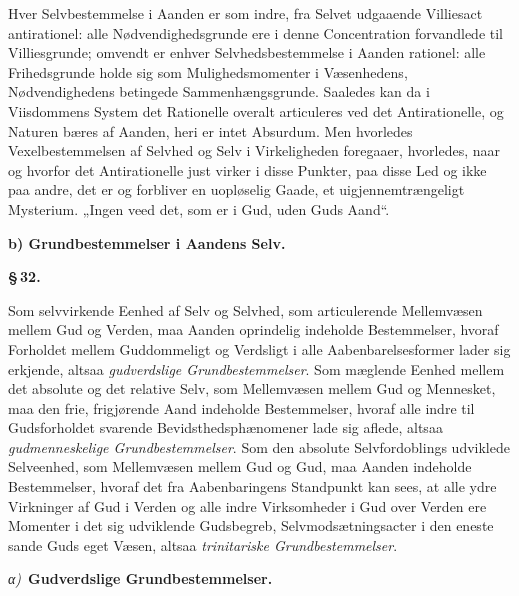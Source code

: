 \documentclass[12pt]{book}
\newcommand{\parmark}[1]{\begin{center}{\bfseries \S\,#1.}\end{center}}
\newcommand{\runhead}[1]{%
  \medskip\begin{center}{\bfseries #1}\end{center}\medskip}
\newcommand{\greekrun}[2]{%
  \medskip\begin{center}{\itshape #1)}\ {\bfseries #2}\end{center}\medskip}
\begin{document}
Hver Selvbestemmelse i Aanden er som indre, fra Selvet udgaaende
Villiesact antirationel: alle Nødvendighedsgrunde ere i denne
Concentration forvandlede til Villiesgrunde; omvendt er enhver
Selvhedsbestemmelse i Aanden rationel: alle Frihedsgrunde holde sig
som Mulighedsmomenter i Væsenhedens, Nødvendighedens betingede
Sammenhængsgrunde. Saaledes kan da i Viisdommens System det
Rationelle overalt articuleres ved det Antirationelle, og Naturen
bæres af Aanden, heri er intet Absurdum. Men hvorledes
Vexelbestemmelsen af Selvhed og Selv i Virkeligheden foregaaer,
hvorledes, naar og hvorfor det Antirationelle just virker i disse
Punkter, paa disse Led og ikke paa andre, det er og forbliver en
uopløselig Gaade, et uigjennemtrængeligt Mysterium. „Ingen veed det,
som er i Gud, uden Guds Aand“.

\runhead{b) Grundbestemmelser i Aandens Selv.}
\parmark{32}

Som selvvirkende Eenhed af Selv og Selvhed, som articulerende
Mellemvæsen mellem Gud og Verden, maa Aanden oprindelig indeholde
Bestemmelser, hvoraf Forholdet mellem Guddommeligt og Verdsligt i
alle Aabenbarelsesformer lader sig erkjende, altsaa
\emph{gudverdslige
Grundbestemmelser}. Som mæglende Eenhed mellem det absolute og det
relative Selv, som Mellemvæsen mellem Gud og Mennesket, maa den
frie, frigjørende Aand indeholde Bestemmelser, hvoraf alle indre til
Gudsforholdet svarende Bevidsthedsphænomener lade sig aflede, altsaa
\emph{gudmenneskelige Grundbestemmelser}. Som den absolute
Selvfordoblings udviklede Selveenhed, som Mellemvæsen mellem Gud og
Gud, maa Aanden indeholde Bestemmelser, hvoraf det fra Aabenbaringens
Standpunkt kan sees, at alle ydre Virkninger af Gud i Verden og alle
indre Virksomheder i Gud over Verden ere Momenter i det sig
udviklende Gudsbegreb, Selvmodsætningsacter i den eneste sande Guds
eget Væsen, altsaa \emph{trinitariske Grundbestemmelser}.

\greekrun{α}{Gudverdslige Grundbestemmelser.}
\end{document}
